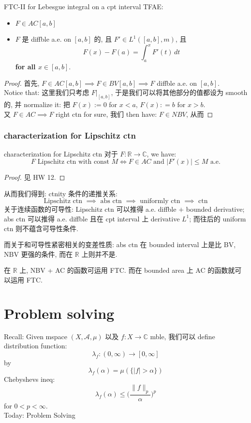 \documentclass[lang=cn,11pt]{elegantbook}
\begin{document}
\begin{theorem}{FTC-II for Lebesgue integral on a cpt interval}
TFAE:
\begin{itemize}
    \item $F\in AC[a,b]$
    \item $F$ 是 diffble a.e. on $[a,b]$ 的, 且 $F'\in L^1([a,b],m)$, 且 \[F(x) - F(a) = \int_a^x F'(t)\, dt\]\textbf{for all $x\in [a,b]$}.
\end{itemize}
\end{theorem}
\begin{proof}
    首先, $F\in AC[a,b]\implies F \in BV[a,b] \implies F$ diffble a.e. on $[a,b]$. \\
    Notice that: 这里我们只考虑 $F|_{[a,b]}$, 于是我们可以将其他部分的值都设为 smooth 的, 并 normalize it: 把 $F(x) := 0 $ for $x< a$, $F(x): = b$ for $x > b$.\\
    又 $F \in AC \implies F$ right ctn for sure, 我们 then have: $F \in NBV$, 从而
\end{proof}



\subsection{characterization for Lipschitz ctn}
\begin{theorem}{characterization for Lipschitz ctn}
    对于 $F:\mathbb{R}\to \mathbb{C}$, we have: \[
    F \text{ Lipschitz ctn with const } M \iff  F \in AC \text{ and } |F'(x)|\le M \text{ a.e.}
    \]
\end{theorem}
\begin{proof}
见 HW 12.
\end{proof}

从而我们得到: ctnity 条件的递推关系: \[
\text{ Lipschitz ctn }\implies   \text{ abs ctn }\implies   \text{ uniformly ctn } \implies  \text{ ctn } 
\]
关于连续函数的可导性:  Lipschitz ctn 可以推得 a.e. diffble $+$ bounded derivative; abs ctn 可以推得 a.e. diffble 且在 cpt interval 上 derivative $L^1$; 而往后的 uniform ctn 则不蕴含可导性条件.


而关于和可导性紧密相关的变差性质: 
abs ctn 在 bounded interval 上是比 BV, NBV 更强的条件, 而在 $\mathbb{R}$ 上则并不是.

在 $\mathbb{R}$ 上, NBV + AC 的函数可运用 FTC. 而在 bounded area 上 AC 的函数就可以运用 FTC.


\chapter{Problem solving}
Recall: Given mspace $(X,\mathcal{A},\mu)$ 以及 $f:X \to \mathbb{C}$ mble, 我们可以 define distribution function: \[
\lambda_f : (0,\infty) \to [0,\infty]
\]
by \[
\lambda_f (\alpha) = \mu(\{\mathbb{}|f| > \alpha \} )
\]
Chebyshevs ineq: \[
\lambda_f(\alpha) \leq  \bigg(\frac{\| f\|_p}{\alpha} \bigg)^p
\]for $0< p < \infty$.\\
Today: Problem Solving
\end{document}
